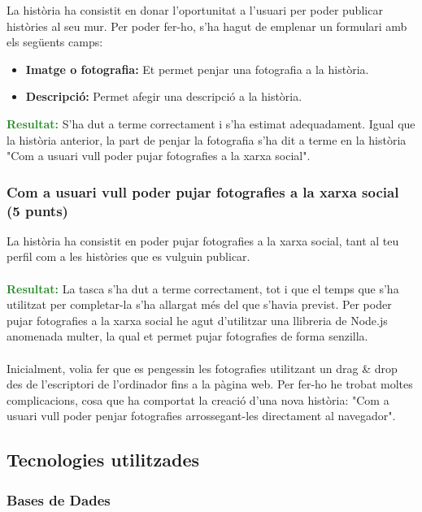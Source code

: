 \documentclass[11pt,catalan,listoffigures,listoftables]{tfgetsinf}
\begin{document}
La història ha consistit en donar l'oportunitat a l'usuari per poder publicar històries al seu mur. Per poder fer-ho, s'ha hagut de emplenar un formulari amb els següents camps:
\begin{itemize}
\item \textbf{Imatge o fotografia:} Et permet penjar una fotografia a la història.
\item \textbf{Descripció:} Permet afegir una descripció a la història.
\end{itemize}
\textcolor{forestgreen}{\textbf{Resultat:}} S'ha dut a terme correctament i s'ha estimat adequadament. Igual que la història anterior, la part de penjar la fotografia s'ha dit a terme en la història "Com a usuari vull poder pujar fotografies a la xarxa social".

\subsubsection{Com a usuari vull poder pujar fotografies a la xarxa social (5 punts)}

La història ha consistit en poder pujar fotografies a la xarxa social, tant al teu perfil com a les històries que es vulguin publicar.\\ \\
\textcolor{forestgreen}{\textbf{Resultat:}} La tasca s'ha dut a terme correctament, tot i que el temps que s'ha utilitzat per completar-la s'ha allargat més del que s'havia previst. Per poder pujar fotografies a la xarxa social he agut d'utilitzar una llibreria de Node.js anomenada multer, la qual et permet pujar fotografies de forma senzilla.\\ \\
Inicialment, volia fer que es pengessin les fotografies utilitzant un drag \& drop des de l'escriptori de l'ordinador fins a la pàgina web. Per fer-ho he trobat moltes complicacions, cosa que ha comportat la creació d'una nova història: "Com a usuari vull poder penjar fotografies arrossegant-les directament al navegador".

\subsection{Tecnologies utilitzades}

\subsubsection{Bases de Dades}
\end{document}
